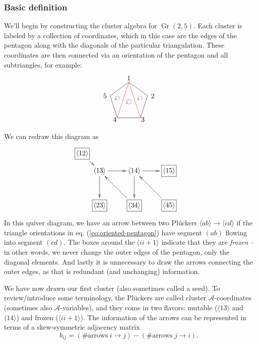 \documentclass[11pt]{article}
\DeclareMathOperator{\Gr}{Gr}
\def\ket#1{\langle #1 \rangle}
\def\a{\mathcal{A}}
\def\drawLabeledPentagon{
\coordinate (P1) at (90:1);
\coordinate (P2) at (18:1);
\coordinate (P3) at (306:1);
\coordinate (P4) at (234:1);
\coordinate (P5) at (162:1);
\draw (P1) -- (P2) -- (P3) -- (P4) -- (P5) -- cycle;
\draw (0,1.2) node {1};
\draw (1,.3) node[anchor=west] {2};
\draw (.5,-.9) node[anchor=west] {3};
\draw (-.5,-.9) node[anchor=east] {4};
\draw (-1,.3) node[anchor=east] {5};
}
\begin{document}
\subsubsection*{Basic definition}

We'll begin by constructing the cluster algebra for $\Gr(2,5)$. Each cluster is labeled by a collection of coordinates, which in this case are the edges of the pentagon along with the diagonals of the particular triangulation. These coordinates are then connected via an orientation of the pentagon and all subtriangles, for example:
\begin{equation}\label{eq:oriented-pentagon}
\begin{tikzpicture}
  \drawLabeledPentagon
  \draw[color=red] (P1) -- (P3);
  \draw[color=red] (P1) -- (P4);
  \draw (18:.6) node[rotate=144] {$\circlearrowleft$};
  \draw (0:0) node[rotate=144] {$\circlearrowleft$};
  \draw (162:.6) node[rotate=144] {$\circlearrowleft$};
\end{tikzpicture} 
\end{equation}
We can redraw this diagram as
\begin{equation}\label{eq:gr25-seed}
\begin{gathered}
\begin{xy} 0;<1pt,0pt>:<0pt,-1pt>::
	(25,25) *+{\langle 13\rangle} ="0",
	(75,25) *+{\langle 14\rangle} ="1",
	(125,25) *+{\framebox[5ex]{$\langle 15\rangle$}} ="2",
	(125,75) *+{\framebox[5ex]{$\langle 45\rangle$}} ="3",
	(75,75) *+{\framebox[5ex]{$\langle 34\rangle$}} ="4",
	(25,75) *+{\framebox[5ex]{$\langle 23\rangle$}} ="5",
	(0,0) *+{\framebox[5ex]{$\langle 12\rangle$}} ="6",
	(145,75) *+{},
	"0", {\ar"1"},
	"4", {\ar"0"},
	"0", {\ar"5"},
	"6", {\ar"0"},
	"1", {\ar"2"},
	"3", {\ar"1"},
	"1", {\ar"4"},
\end{xy}
\end{gathered}
\end{equation}
In this quiver diagram, we have an arrow between two Pl\"uckers $\ket{ab} \to \ket{cd}$ if the triangle orientations in eq. (\ref{eq:oriented-pentagon}) have segment $(ab)$ flowing into segment $(cd)$. The boxes around the $\ket{ii+1}$ indicate that they are \emph{frozen} -- in other words, we never change the outer edges of the pentagon, only the diagonal elements. And lastly it is unnecessary to draw the arrows connecting the outer edges, as that is redundant (and unchanging) information. 

We have now drawn our first cluster (also sometimes called a seed). To review/introduce some terminology, the Pl\"uckers are called cluster $\a$-coordinates (sometimes also $\a$-variables), and they come in two flavors: mutable ($\ket{13}$ and $\ket{14}$) and frozen ($\ket{ii+1}$). The information of the arrows can be represented in terms of a skew-symmetric adjacency matrix
\begin{equation}
	b_{i j} = (\# \text{arrows}\; i \to j) - (\# \text{arrows}\; j \to i).
\label{eq:bijdef}
\end{equation}
\end{document}

